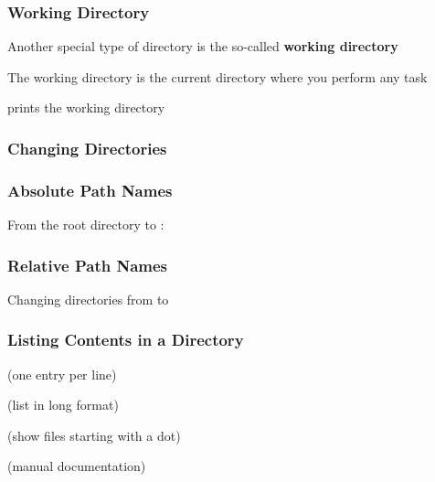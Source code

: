 \documentclass[12pt]{beamer}\usepackage[]{graphicx}\usepackage[]{color}
\begin{document}

\begin{frame}
\frametitle{Working Directory}
\bi
  \item Another special type of directory is the so-called \textbf{working directory}
  \item The working directory is the current directory where you perform any task
  \item {\hilit {}} prints the working directory
\ei
\end{frame}


\begin{frame}
\frametitle{Changing Directories}
\bi
  \item {}
  \item {}
  \item {}
  \item {}
  \item {}
\ei
\end{frame}


\begin{frame}[fragile]
\frametitle{Absolute Path Names}
\begin{center}
\end{center}

From the root directory to : \\
{\hilit {}}

\end{frame}


\begin{frame}[fragile]
\frametitle{Relative Path Names}
\begin{center}
\end{center}

Changing directories from  to  \\
{\hilit {}}

\end{frame}


\begin{frame}
\frametitle{Listing Contents in a Directory}
\bi
  \item {}
  \item {} (one entry per line)
  \item {} (list in long format)
  \item {} (show files starting with a dot)
  \item {} (manual documentation)
\ei
\end{frame}
\end{document}
